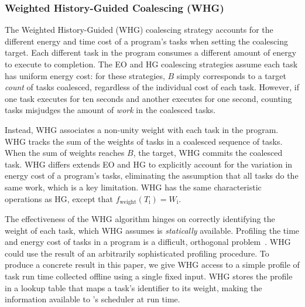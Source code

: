 
\subsubsection{Weighted History-Guided Coalescing (WHG)}
\label{subsec:energyTaskAware}

The Weighted History-Guided (WHG) coalescing strategy accounts for the
different energy and time cost of a program's tasks when setting the coalescing
target.
%
Each different task in the program consumes a different amount of energy to
execute to completion.  
%
The EO and HG coalescing strategies assume each task has uniform energy cost:
for these strategies, $B$ simply corresponds to a target {\em count} of tasks
coalesced, regardless of the individual cost of each task.
%
However, if one task executes for ten seconds and another executes for one
second, counting tasks misjudges the amount of {\em work} in the coalesced
tasks.

Instead, WHG associates a non-unity weight with each task in the program. 
%
WHG tracks the sum of the weights of tasks in a coalesced sequence of tasks.
%
When the sum of weights reaches $B$, the target, WHG commits the coalesced
task.
%
WHG differs extends EO and HG to explicitly account for the variation in energy
cost of a program's tasks, eliminating the assumption that all tasks do the
same work, which is a key limitation.
%
WHG has the same characteristic operations as HG, except that
$f_\text{weight}(T_\text{i}) = W_\text{i}$.

The effectiveness of the WHG algorithm hinges on correctly identifying the
weight of each task, which WHG assumes is {\em statically} available.
%
Profiling the time and energy cost of tasks in a program is a difficult,
orthogonal problem~\cite{cleancut_2018,baghsorkhi_cgo_2018}.
%
WHG could use the result of an arbitrarily sophisticated profiling procedure.
%
To produce a concrete result in this paper, we give WHG access to a simple
profile of task run time collected offline using a single fixed input.
%
WHG stores the profile in a lookup table that maps a task's identifier to its
weight, making the information available to \sys's scheduler at run time.
